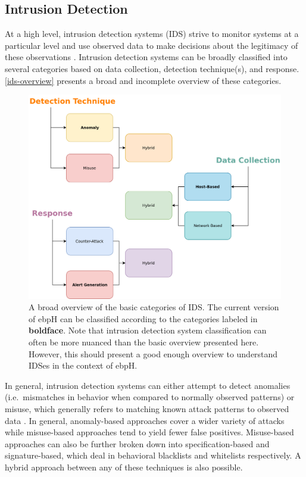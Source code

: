 \documentclass[
  12pt]{findlay}
\begin{document}
\hypertarget{intrusion-detection}{%
\subsection{Intrusion Detection}\label{intrusion-detection}}

At a high level, intrusion detection systems (IDS) strive to monitor
systems at a particular level and use observed data to make decisions
about the legitimacy of these observations \autocite{kemmerer02}.
Intrusion detection systems can be broadly classified into several
categories based on data collection, detection technique(s), and
response. \autoref{ids-overview} presents a broad and incomplete
overview of these categories.

\begin{figure}
\begin{center}
\includegraphics{../figures/ids-overview.png}
\end{center}
\caption[An overview of the basic categories of IDS.]
{
A broad overview of the basic categories of IDS.
The current version of ebpH can be classified according to the
categories labeled in \textbf{boldface}. Note that intrusion detection
system classification can often be more nuanced than the basic overview presented
here. However, this should present a good enough overview to understand IDSes in
the context of ebpH.
}
\label{ids-overview}
\end{figure}

In general, intrusion detection systems can either attempt to detect
anomalies (i.e.~mismatches in behavior when compared to normally
observed patterns) or misuse, which generally refers to matching known
attack patterns to observed data \autocite{kemmerer02}. In general,
anomaly-based approaches cover a wider variety of attacks while
misuse-based approaches tend to yield fewer false positives.
Misuse-based approaches can also be further broken down into
specification-based and signature-based, which deal in behavioral
blacklists and whitelists respectively. A hybrid approach between any of
these techniques is also possible.
\end{document}
